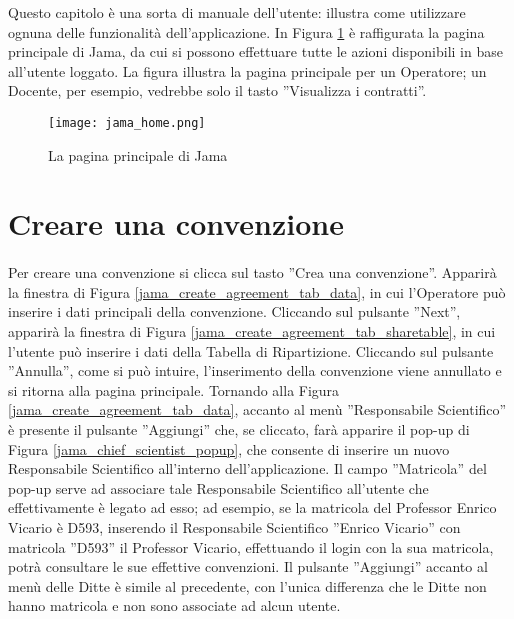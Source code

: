 Questo capitolo è una sorta di manuale dell'utente: illustra come utilizzare ognuna delle funzionalità dell'applicazione. In Figura \ref{jama_home} è raffigurata la pagina principale di Jama, da cui si possono effettuare tutte le azioni disponibili in base all'utente loggato. La figura illustra la pagina principale per un Operatore; un Docente, per esempio, vedrebbe solo il tasto ''Visualizza i contratti''.
\begin{figure}[h]
	\centering
	\texttt{[image: jama\_home.png]}
	\caption{La pagina principale di Jama}
	\label{jama_home}
\end{figure}

\section{Creare una convenzione}
\paragraph{}
Per creare una convenzione si clicca sul tasto ''Crea una convenzione''. Apparirà la finestra di Figura \ref{jama_create_agreement_tab_data}, in cui l'Operatore può inserire i dati principali della convenzione. Cliccando sul pulsante ''Next'', apparirà la finestra di Figura \ref{jama_create_agreement_tab_sharetable}, in cui l'utente può inserire i dati della Tabella di Ripartizione. Cliccando sul pulsante ''Annulla'', come si può intuire, l'inserimento della convenzione viene annullato e si ritorna alla pagina principale.\newline
Tornando alla Figura \ref{jama_create_agreement_tab_data}, accanto al menù ''Responsabile Scientifico'' è presente il pulsante ''Aggiungi'' che, se cliccato, farà apparire il pop-up di Figura \ref{jama_chief_scientist_popup}, che consente di inserire un nuovo Responsabile Scientifico all'interno dell'applicazione. Il campo ''Matricola'' del pop-up serve ad associare tale Responsabile Scientifico all'utente che effettivamente è legato ad esso; ad esempio, se la matricola del Professor Enrico Vicario è D593, inserendo il Responsabile Scientifico ''Enrico Vicario'' con matricola ''D593'' il Professor Vicario, effettuando il login con la sua matricola, potrà consultare le sue effettive convenzioni.\newline
Il pulsante ''Aggiungi'' accanto al menù delle Ditte è simile al precedente, con l'unica differenza che le Ditte non hanno matricola e non sono associate ad alcun utente.\newline

